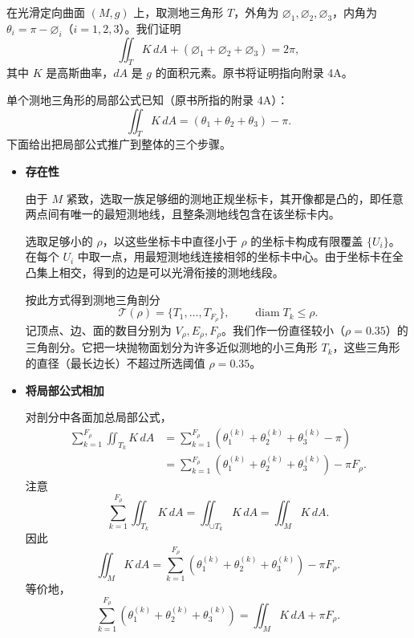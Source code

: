 在光滑定向曲面 $(M,g)$ 上，取测地三角形 $T$，外角为 $\varnothing_1,\varnothing_2,\varnothing_3$，内角为 $\theta_i=\pi-\varnothing_i$（$i=1,2,3$）。我们证明
\[
  \iint_T K\,dA+(\varnothing_1+\varnothing_2+\varnothing_3)=2\pi,
\]
其中 $K$ 是高斯曲率，$dA$ 是 $g$ 的面积元素。原书将证明指向附录 4A。

单个测地三角形的局部公式已知（原书所指的附录 4A）：
\[
  \iint_T K\,dA=(\theta_1+\theta_2+\theta_3)-\pi.
\]
下面给出把局部公式推广到整体的三个步骤。

\begin{itemize}
  \item \textbf{存在性}

  由于 $M$ 紧致，选取一族足够细的测地正规坐标卡，其开像都是凸的，即任意两点间有唯一的最短测地线，且整条测地线包含在该坐标卡内。

  选取足够小的 $\rho$，以这些坐标卡中直径小于 $\rho$ 的坐标卡构成有限覆盖 $\{U_i\}$。在每个 $U_i$ 中取一点，用最短测地线连接相邻的坐标卡中心。由于坐标卡在全凸集上相交，得到的边是可以光滑衔接的测地线段。

  按此方式得到测地三角剖分
  \[
    \mathcal T(\rho)=\{T_1,\ldots,T_{F_\rho}\},\qquad
    \operatorname{diam}T_k\le\rho.
  \]
  记顶点、边、面的数目分别为 $V_\rho,E_\rho,F_\rho$。我们作一份直径较小（$\rho=0.35$）的三角剖分。它把一块抛物面划分为许多近似测地的小三角形 $T_k$，这些三角形的直径（最长边长）不超过所选阈值 $\rho=0.35$。
  \item \textbf{将局部公式相加}

  对剖分中各面加总局部公式，
  \[
    \begin{aligned}
    \sum_{k=1}^{F_\rho}\iint_{T_k}K\,dA
      &=\sum_{k=1}^{F_\rho}(\theta_1^{(k)}+\theta_2^{(k)}+\theta_3^{(k)}-\pi)\\
      &=\sum_{k=1}^{F_\rho}(\theta_1^{(k)}+\theta_2^{(k)}+\theta_3^{(k)})
         -\pi F_\rho.
    \end{aligned}
  \]
  注意
  \[
    \sum_{k=1}^{F_\rho}\iint_{T_k}K\,dA
       =\iint_{\cup T_k}K\,dA=\iint_M K\,dA.
  \]
  因此
  \begin{equation*}
    \iint_M K\,dA
      =\sum_{k=1}^{F_\rho}(\theta_1^{(k)}+\theta_2^{(k)}+\theta_3^{(k)})
       -\pi F_\rho.
    \tag{5.21}\label{eq:5.21}
  \end{equation*}
  等价地，
  \[
    \sum_{k=1}^{F_\rho}(\theta_1^{(k)}+\theta_2^{(k)}+\theta_3^{(k)})
       =\iint_M K\,dA+\pi F_\rho.
  \]


\end{itemize}
